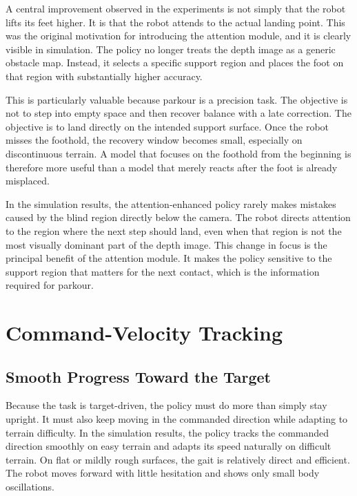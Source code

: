 A central improvement observed in the experiments is not simply that the robot lifts its feet higher. It is that the robot attends to the actual landing point. This was the original motivation for introducing the attention module, and it is clearly visible in simulation. The policy no longer treats the depth image as a generic obstacle map. Instead, it selects a specific support region and places the foot on that region with substantially higher accuracy.

This is particularly valuable because parkour is a precision task. The objective is not to step into empty space and then recover balance with a late correction. The objective is to land directly on the intended support surface. Once the robot misses the foothold, the recovery window becomes small, especially on discontinuous terrain. A model that focuses on the foothold from the beginning is therefore more useful than a model that merely reacts after the foot is already misplaced.

In the simulation results, the attention-enhanced policy rarely makes mistakes caused by the blind region directly below the camera. The robot directs attention to the region where the next step should land, even when that region is not the most visually dominant part of the depth image. This change in focus is the principal benefit of the attention module. It makes the policy sensitive to the support region that matters for the next contact, which is the information required for parkour.

\section{Command-Velocity Tracking}
\label{sec:command_velocity_tracking}

\subsection{Smooth Progress Toward the Target}
\label{sec:smooth_progress}

Because the task is target-driven, the policy must do more than simply stay upright. It must also keep moving in the commanded direction while adapting to terrain difficulty. In the simulation results, the policy tracks the commanded direction smoothly on easy terrain and adapts its speed naturally on difficult terrain. On flat or mildly rough surfaces, the gait is relatively direct and efficient. The robot moves forward with little hesitation and shows only small body oscillations.

